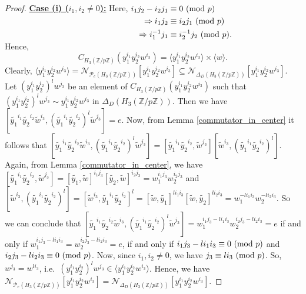 \documentclass[12pt,a4paper]{article}
\begin{document}
\begin{proof}
\vspace{.3cm}
\noindent\underline{\textbf{Case (i) ($i_1, i_2\neq 0$):}} Here, 
$\begin{aligned}[t]
 i_1j_2-i_2j_1&\equiv 0~({\rm mod}~p)\\
 \Rightarrow i_1j_2&\equiv i_2j_1~({\rm mod}~p)\\
 \Rightarrow i_1^{-1}j_1&\equiv i_2^{-1}j_2~({\rm mod}~p).\\
\end{aligned}$\\
Hence, \[C_{H_3(\mathbb{Z}/p\mathbb{Z})}(y_1^{i_1}y_2^{i_2}w^{i_3})=\langle y_1^{i_1}y_2^{i_2}w^{i_3}\rangle\times\langle w\rangle.\] Clearly, $\langle y_1^{i_1}y_2^{i_2}w^{i_3}\rangle=\mathcal{N}_{\mathcal{P}_e(H_3(\mathbb{Z}/p\mathbb{Z}))}[y_1^{i_1}y_2^{i_2}w^{i_3}]\subseteq \mathcal{N}_{\Delta_D(H_3(\mathbb{Z}/p\mathbb{Z}))}[y_1^{i_1}y_2^{i_2}w^{i_3}]$. Let $(y_1^{i_1}y_2^{i_2})^lw^{j_3}$ be an element of $C_{H_3(\mathbb{Z}/p\mathbb{Z})}(y_1^{i_1}y_2^{i_2}w^{i_3})$ such that $(y_1^{i_1}y_2^{i_2})^lw^{j_3}\sim y_1^{i_1}y_2^{i_2}w^{i_3}$ in $\Delta_D(H_3(\mathbb{Z}/p\mathbb{Z}))$. Then we have $[\tilde{y_1}^{i_1}\tilde{y_2}^{i_2}\tilde{w}^{i_3}, (\tilde{y_1}^{i_1}\tilde{y_2}^{i_2})^l\tilde{w}^{j_3}]=e$. Now, from Lemma \ref{commutator_in_center} it follows that $[\tilde{y_1}^{i_1}\tilde{y_2}^{i_2}\tilde{w}^{i_3}, (\tilde{y_1}^{i_1}\tilde{y_2}^{i_2})^l\tilde{w}^{j_3}]=[\tilde{y_1}^{i_1}\tilde{y_2}^{i_2},\tilde{w}^{j_3}][\tilde{w}^{i_3},(\tilde{y_1}^{i_1}\tilde{y_2}^{i_2})^l]$. Again, from Lemma \ref{commutator_in_center}, we have $[\tilde{y_1}^{i_1}\tilde{y_2}^{i_2},\tilde{w}^{j_3}]=[\tilde{y_1},\tilde{w}]^{i_1j_3}[\tilde{y_2},\tilde{w}]^{i_2j_3}=w_1^{i_1j_3}w_2^{i_2j_3}$ and $[\tilde{w}^{i_3},(\tilde{y_1}^{i_1}\tilde{y_2}^{i_2})^l]=[\tilde{w}^{i_3},\tilde{y_1}^{i_1}\tilde{y_2}^{i_2}]^l=[\tilde{w},\tilde{y_1}]^{li_1i_3}[\tilde{w},\tilde{y_2}]^{li_2i_3}=w_1^{-li_1i_3}w_2^{-li_2i_3}$. So we can conclude that $[\tilde{y_1}^{i_1}\tilde{y_2}^{i_2}\tilde{w}^{i_3}, (\tilde{y_1}^{i_1}\tilde{y_2}^{i_2})^l\tilde{w}^{j_3}]=w_1^{i_1j_3-li_1i_3}w_2^{i_2j_3-li_2i_3}=e$ if and only if $w_1^{i_1j_3-li_1i_3}=w_2^{i_2j_3-li_2i_3}=e$, if and only if $i_1j_3-li_1i_3\equiv 0~({\rm mod}~p)$ and $i_2j_3-li_2i_3\equiv 0~({\rm mod}~p)$. Now, since $i_1, i_2\neq 0$, we have $j_3\equiv li_3~({\rm mod}~p)$. So, $w^{j_3}=w^{li_3}$, i.e.~$(y_1^{i_1}y_2^{i_2})^lw^{j_3}\in\langle y_1^{i_1}y_2^{i_2}w^{i_3}\rangle$. Hence, we have $\mathcal{N}_{\mathcal{P}_e(H_3(\mathbb{Z}/p\mathbb{Z}))}[y_1^{i_1}y_2^{i_2}w^{i_3}]= \mathcal{N}_{\Delta_D(H_3(\mathbb{Z}/p\mathbb{Z}))}[y_1^{i_1}y_2^{i_2}w^{i_3}]$.


\end{proof}
\end{document}
